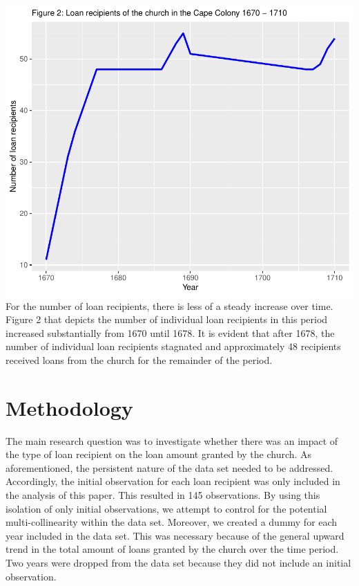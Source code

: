 \documentclass[11pt,preprint, authoryear]{elsarticle}
\numberwithin{equation}{section}
\numberwithin{figure}{section}
\numberwithin{table}{section}
\begin{document}
\includegraphics{HistoryEssay_files/figure-latex/unnamed-chunk-2-1.pdf}
For the number of loan recipients, there is less of a steady increase
over time. Figure 2 that depicts the number of individual loan
recipients in this period increased substantially from 1670 until 1678.
It is evident that after 1678, the number of individual loan recipients
stagnated and approximately 48 recipients received loans from the church
for the remainder of the period.

\hypertarget{methodology}{%
\section{\texorpdfstring{Methodology
\label{Meth}}{Methodology }}\label{methodology}}

The main research question was to investigate whether there was an
impact of the type of loan recipient on the loan amount granted by the
church. As aforementioned, the persistent nature of the data set needed
to be addressed. Accordingly, the initial observation for each loan
recipient was only included in the analysis of this paper. This resulted
in 145 observations. By using this isolation of only initial
observations, we attempt to control for the potential multi-collinearity
within the data set. Moreover, we created a dummy for each year included
in the data set. This was necessary because of the general upward trend
in the total amount of loans granted by the church over the time period.
Two years were dropped from the data set because they did not include an
initial observation.
\end{document}

